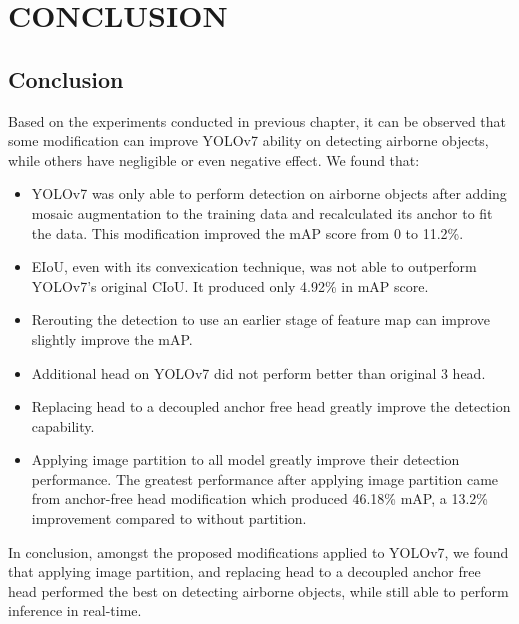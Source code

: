 \chapter{CONCLUSION}


\section{Conclusion}
\label{section:conclusion}

Based on the experiments conducted in previous chapter, it can be observed that some modification
can improve YOLOv7 ability on detecting airborne objects, while others have negligible or even negative effect.
We found that:
\begin{itemize}[noitemsep,topsep=0pt]
  \item YOLOv7 was only able to perform detection on airborne objects after adding mosaic augmentation to the training data and recalculated its anchor to fit the data.
  This modification improved the mAP score from 0 to 11.2\%.
  \item EIoU, even with its convexication technique, was not able to outperform YOLOv7's original CIoU. It produced only 4.92\% in mAP score.
  \item Rerouting the detection to use an earlier stage of feature map can improve slightly improve the mAP.
  \item Additional head on YOLOv7 did not perform better than original 3 head.
  \item Replacing head to a decoupled anchor free head greatly improve the detection capability.
  \item Applying image partition to all model greatly improve their detection performance. The greatest performance after applying image partition
  came from anchor-free head modification which produced 46.18\% mAP, a 13.2\% improvement compared to without partition.
\end{itemize}

In conclusion, amongst the proposed modifications applied to YOLOv7, we found that applying image partition, and replacing
head to a decoupled anchor free head performed the best on detecting airborne objects, while still able to perform inference in real-time.



